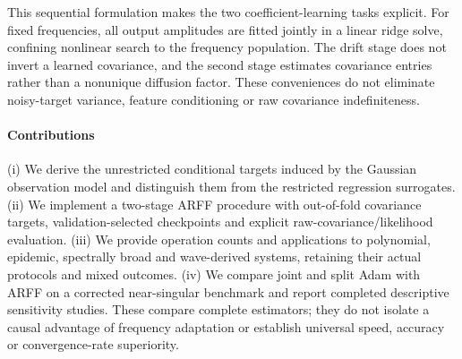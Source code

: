 \documentclass{article}
\newcommand{\greennote}[1]{{\color{green!60!black}\textbf{[Suggestion:} #1\textbf{]}}}
\begin{document}
This sequential formulation makes the two coefficient-learning tasks explicit. For fixed frequencies, all output amplitudes are fitted jointly in a linear ridge solve, confining nonlinear search to the frequency population. The drift stage does not invert a learned covariance, and the second stage estimates covariance entries rather than a nonunique diffusion factor. These conveniences do not eliminate noisy-target variance, feature conditioning or raw covariance indefiniteness.

\paragraph{Contributions}
(i) We derive the unrestricted conditional targets induced by the Gaussian observation model and distinguish them from the restricted regression surrogates.
(ii) We implement a two-stage ARFF procedure with out-of-fold covariance targets, validation-selected checkpoints and explicit raw-covariance/likelihood evaluation.
(iii) We provide operation counts and applications to polynomial, epidemic, spectrally broad and wave-derived systems, retaining their actual protocols and mixed outcomes.
(iv) We compare joint and split Adam with ARFF on a corrected near-singular benchmark and report completed descriptive sensitivity studies. These compare complete estimators; they do not isolate a causal advantage of frequency adaptation or establish universal speed, accuracy or convergence-rate superiority.
\end{document}
